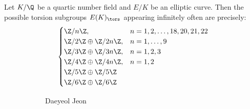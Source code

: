 \begin{frame}[plain]
\begin{thm}
Let $K/\Q$ be a quartic number field and $E/K$ be an elliptic curve. Then the possible torsion subgroups $E(K)_\tors$ appearing infinitely often are precisely:
	\[
	\begin{cases}
	\Z/n\Z, & n=1,2,\ldots,18,20,21,22 \\
	\Z/2\Z \oplus \Z/2n\Z, & n=1,\ldots,9 \\
	\Z/3\Z \oplus \Z/3n\Z, & n=1,2,3 \\
	\Z/4\Z \oplus \Z/4n\Z, & n=1,2 \\
	\Z/5\Z \oplus \Z/5\Z \\
	\Z/6\Z \oplus \Z/6\Z
	\end{cases}
	\]
\end{thm}
	\begin{figure}[h]
	\centering
	\begin{subfigure}{0.3\textwidth}
	\captionsetup{labelformat=empty}
	\centering
	\caption{\hspace{0.1cm}Daeyeol Jeon}
	\end{subfigure}
	\begin{subfigure}{0.3\textwidth}
	\captionsetup{labelformat=empty}
	\centering

\end{subfigure}
\end{figure}
\end{frame}
